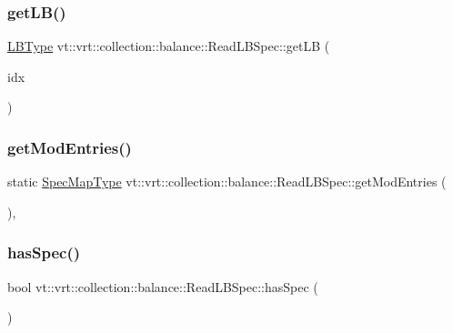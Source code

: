 \subsubsection{\texorpdfstring{get\+L\+B()}{getLB()}}
{\footnotesize\ttfamily \hyperlink{namespacevt_1_1vrt_1_1collection_1_1balance_ac4f99693509affcc67db182d4aad9b5c}{L\+B\+Type} vt\+::vrt\+::collection\+::balance\+::\+Read\+L\+B\+Spec\+::get\+LB (\begin{DoxyParamCaption}\item[{\hyperlink{namespacevt_1_1vrt_1_1collection_1_1balance_a72a5e0d9936ddf57f8e6c64e0e9fd123}{Spec\+Index} const \&}]{idx }\end{DoxyParamCaption})\hspace{0.3cm}{\ttfamily [static]}}

\mbox{\label{structvt_1_1vrt_1_1collection_1_1balance_1_1_read_l_b_spec_a8fbbc8343a79844abdfd16536ff4ea2b}} 
\subsubsection{\texorpdfstring{get\+Mod\+Entries()}{getModEntries()}}
{\footnotesize\ttfamily static \hyperlink{structvt_1_1vrt_1_1collection_1_1balance_1_1_read_l_b_spec_aa73c3611c615832402eeeed6fb7b8049}{Spec\+Map\+Type} vt\+::vrt\+::collection\+::balance\+::\+Read\+L\+B\+Spec\+::get\+Mod\+Entries (\begin{DoxyParamCaption}{ }\end{DoxyParamCaption})\hspace{0.3cm}{\ttfamily [inline]}, {\ttfamily [static]}}

\mbox{\label{structvt_1_1vrt_1_1collection_1_1balance_1_1_read_l_b_spec_a38f65064cd81275eb9c9d596d0f0a35f}} 
\subsubsection{\texorpdfstring{has\+Spec()}{hasSpec()}}
{\footnotesize\ttfamily bool vt\+::vrt\+::collection\+::balance\+::\+Read\+L\+B\+Spec\+::has\+Spec (\begin{DoxyParamCaption}{ }\end{DoxyParamCaption})\hspace{0.3cm}{\ttfamily [static]}}

